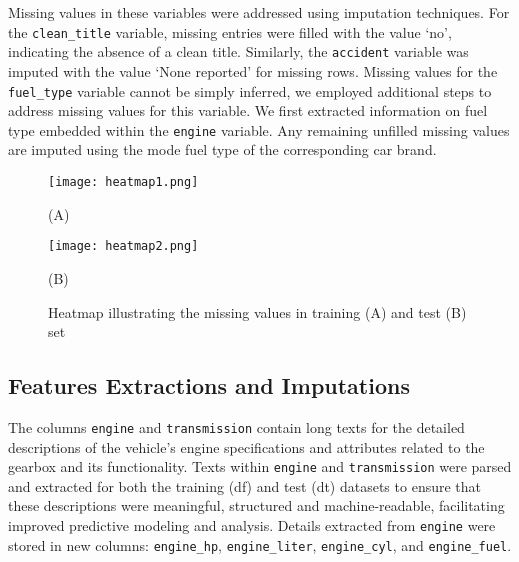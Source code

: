 \documentclass{article}
\begin{document}
Missing values in these variables were addressed using imputation techniques. For the \texttt{clean\_title} variable, missing entries were filled with the value `no', indicating the absence of a clean title. Similarly, the \texttt{accident} variable was imputed with the value `None reported' for missing rows. Missing values for the \texttt{fuel\_type} variable cannot be simply inferred, we employed additional steps to address missing values for this variable. We first extracted information on fuel type embedded within the \texttt{engine} variable. Any remaining unfilled missing values are imputed using the mode fuel type of the corresponding car brand.

\begin{figure}[H]
   \centering
   \begin{minipage}[b]{0.45\textwidth}
       \centering
       \texttt{[image: heatmap1.png]}
       \centerline{(A)}
   \end{minipage}
   \hfill
   \begin{minipage}[b]{0.45\textwidth}
       \centering
       \texttt{[image: heatmap2.png]}
       \centerline{(B)} 
   \end{minipage}
   \caption{Heatmap illustrating the missing values in training (A) and test (B) set}
   \label{fig:heatmaps}
\end{figure}

\subsection{Features Extractions and Imputations}

The columns \texttt{engine} and \texttt{transmission} contain long texts for the detailed descriptions of the vehicle's engine specifications and attributes related to the gearbox and its functionality. Texts within \texttt{engine} and \texttt{transmission} were parsed and extracted for both the training (df) and test (dt) datasets to ensure that these descriptions were meaningful, structured and machine-readable, facilitating improved predictive modeling and analysis. Details extracted from \texttt{engine} were stored in new columns: \texttt{engine\_hp}, \texttt{engine\_liter}, \texttt{engine\_cyl}, and \texttt{engine\_fuel}.
\end{document}
